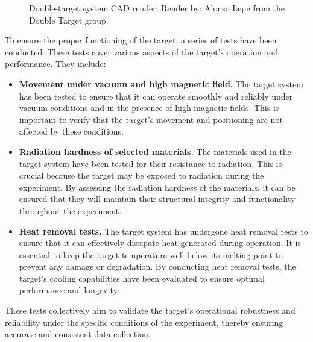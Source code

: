     \begin{figure}[b!]
        \centering{}
        \caption[Double-target system.]{Double-target system CAD render.
        Render by: Alonso Lepe from the Double Target group.}
        \label{fig::double_target}
    \end{figure}

    To ensure the proper functioning of the target, a series of tests have been conducted.
    These tests cover various aspects of the target's operation and performance.
    They include:

    \begin{itemize}
        \item
            \textbf{Movement under vacuum and high magnetic field.}
            The target system has been tested to ensure that it can operate smoothly and reliably under vacuum conditions and in the presence of high magnetic fields.
            This is important to verify that the target's movement and positioning are not affected by these conditions.

        \item
            \textbf{Radiation hardness of selected materials.}
            The materials used in the target system have been tested for their resistance to radiation.
            This is crucial because the target may be exposed to radiation during the experiment.
            By assessing the radiation hardness of the materials, it can be ensured that they will maintain their structural integrity and functionality throughout the experiment.

        \item
            \textbf{Heat removal tests.}
            The target system has undergone heat removal tests to ensure that it can effectively dissipate heat generated during operation.
            It is essential to keep the target temperature well below its melting point to prevent any damage or degradation.
            By conducting heat removal tests, the target's cooling capabilities have been evaluated to ensure optimal performance and longevity.
    \end{itemize}

    These tests collectively aim to validate the target's operational robustness and reliability under the specific conditions of the experiment, thereby ensuring accurate and consistent data collection.

    
